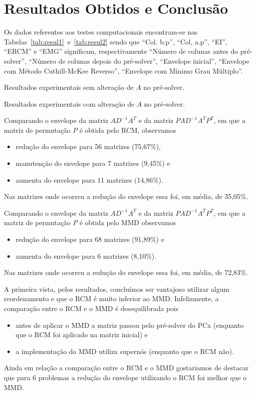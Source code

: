 \section{Resultados Obtidos e Conclusão}
Os dados referentes aos testes computacionais encontram-se nas
Tabelas~\ref{tab:resul1}~e~\ref{tab:resul2} sendo que ``Col. b.p'', ``Col,
a.p'', ``EI'', ``ERCM'' e ``EMG'' significam, respectivamente ``Número de
colunas antes do pré-solver'', ``Número de colunas depois do pré-solver'',
``Envelope inicial'', ``Envelope com Método Cuthill-McKee Reverso'', ``Envelope
com Mínimo Grau Múltiplo''.
\begin{table}[h]
    \centering
    \caption{Resultados experimentais sem alteração de $A$ no pré-solver.}
    \label{tab:resul1}
\end{table}
\begin{sidewaystable}
  \caption{Resultados experimentais com alteração de $A$ no pré-solver.}
  \label{tab:resul2}
  \hfill\vspace{-11pt}
\end{sidewaystable}

Comparando o envelope da matriz $A D^{-1} A^T$ e da matriz $P A D^{-1} A^T P^T$,
em que a matriz de permutação $P$ é obtida pelo RCM, observamos
\begin{itemize}
    \item redução do envelope para 56 matrizes (75,67\%),
    \item manutenção do envelope para 7 matrizes (9,45\%) e
    \item aumenta do envelope para 11 matrizes (14,86\%).
\end{itemize}
Nas matrizes onde ocorreu a redução do envelope essa foi, em média, de 35,05\%.

Comparando o envelope da matriz $A D^{-1} A^T$ e da matriz $P A D^{-1} A^T P^T$,
em que a matriz de permutação $P$ é obtida pelo MMD
observamos
\begin{itemize}
    \item redução do envelope para 68 matrizes (91,89\%) e
    \item aumenta do envelope para 6 matrizes (8,10\%).
\end{itemize}
Nas matrizes onde ocorreu a redução do envelope essa foi, em média, de 72,83\%.

A primeira vista, pelos resultados, concluímos ser vantajoso utilizar algum
reordenamento e que o RCM é muito inferior ao MMD. Infelizmente, a comparação
entre o RCM e o MMD é desequilibrada pois
\begin{itemize}
  \item antes de aplicar o MMD a matriz passou pelo pré-solver do PCx (enquanto
    que o RCM foi aplicado na matriz inicial) e
  \item a implementação do MMD utiliza supernós (enquanto que o RCM não).
\end{itemize}
Ainda em relação a comparação entre o RCM e o MMD gostariamos de destacar que
para 6 problemas a redução do envelope utilizando o RCM foi melhor que o MMD.
